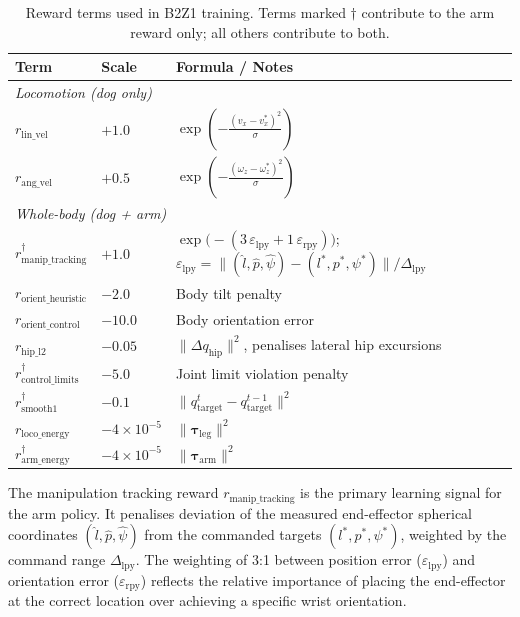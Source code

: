 \begin{table}[htbp]
  \centering
  \caption{Reward terms used in B2Z1 training.  Terms marked $\dagger$
           contribute to the arm reward only; all others contribute to both.}
  \label{tab:rewards}
  \renewcommand{\arraystretch}{1.1}
  \begin{tabular}{lll}
    \toprule
    \textbf{Term} & \textbf{Scale} & \textbf{Formula / Notes} \\
    \midrule
    \multicolumn{3}{l}{\textit{Locomotion (dog only)}} \\
    $r_\text{lin\_vel}$         & $+1.0$ &
      $\exp\!\left(-\tfrac{(v_x - v_x^*)^2}{\sigma}\right)$ \\
    $r_\text{ang\_vel}$         & $+0.5$ &
      $\exp\!\left(-\tfrac{(\omega_z - \omega_z^*)^2}{\sigma}\right)$ \\
    \midrule
    \multicolumn{3}{l}{\textit{Whole-body (dog + arm)}} \\
    $r_\text{manip\_tracking}^\dagger$
                                & $+1.0$ &
      $\exp\!\bigl(-(3\,\varepsilon_\text{lpy} +
                      1\,\varepsilon_\text{rpy})\bigr)$;
      $\varepsilon_\text{lpy}=\|(\hat{l},\hat{p},\hat{\psi}) -
                                (l^*,p^*,\psi^*)\|/\Delta_\text{lpy}$ \\
    $r_\text{orient\_heuristic}$& $-2.0$ & Body tilt penalty \\
    $r_\text{orient\_control}$  & $-10.0$& Body orientation error \\
    $r_\text{hip\_l2}$          & $-0.05$& $\|\Delta q_\text{hip}\|^2$,
      penalises lateral hip excursions \\
    $r_\text{control\_limits}^\dagger$
                                & $-5.0$ & Joint limit violation penalty \\
    $r_\text{smooth1}^\dagger$  & $-0.1$ &
      $\|q_\text{target}^t - q_\text{target}^{t-1}\|^2$ \\
    $r_\text{loco\_energy}$     & $-4\times10^{-5}$ &
      $\|\boldsymbol{\tau}_\text{leg}\|^2$ \\
    $r_\text{arm\_energy}^\dagger$
                                & $-4\times10^{-5}$ &
      $\|\boldsymbol{\tau}_\text{arm}\|^2$ \\
    \bottomrule
  \end{tabular}
\end{table}

The manipulation tracking reward $r_\text{manip\_tracking}$ is the primary
learning signal for the arm policy.
It penalises deviation of the measured end-effector spherical coordinates
$(\hat{l},\hat{p},\hat{\psi})$ from the commanded targets
$(l^*,p^*,\psi^*)$, weighted by the command range $\Delta_\text{lpy}$.
The weighting of 3:1 between position error ($\varepsilon_\text{lpy}$) and
orientation error ($\varepsilon_\text{rpy}$) reflects the relative
importance of placing the end-effector at the correct location
over achieving a specific wrist orientation.


